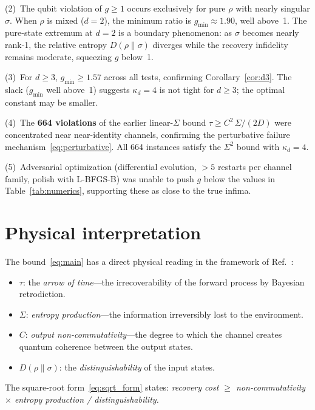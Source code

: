 \documentclass[prl,twocolumn,superscriptaddress,longbibliography,floatfix]{revtex4-2}
\newcommand{\tauasym}{\tau}
\newcommand{\kd}{\kappa_d}
\begin{document}
(2)~The qubit violation of $g \geq 1$ occurs
exclusively for pure $\rho$ with nearly singular
$\sigma$.
When $\rho$ is mixed ($d = 2$), the minimum ratio is
$g_{\min} \approx 1.90$, well above~1.
The pure-state extremum at $d = 2$ is a boundary
phenomenon: as $\sigma$ becomes nearly rank-1,
the relative entropy $D(\rho\|\sigma)$ diverges
while the recovery infidelity remains moderate,
squeezing $g$ below~1.

(3)~For $d \geq 3$, $g_{\min} \geq 1.57$ across all
tests, confirming Corollary~\ref{cor:d3}.
The slack ($g_{\min}$ well above~1) suggests $\kd = 4$
is not tight for $d \geq 3$; the optimal constant may
be smaller.

(4)~The \textbf{664 violations} of the earlier
linear-$\Sigma$ bound $\tauasym \geq C^2\,\Sigma/(2D)$
were concentrated near near-identity channels,
confirming the perturbative failure
mechanism~\eqref{eq:perturbative}.
All 664 instances satisfy the $\Sigma^2$ bound with
$\kd = 4$.

(5)~Adversarial optimization (differential evolution,
$>5$ restarts per channel family, polish with L-BFGS-B)
was unable to push $g$ below the values in
Table~\ref{tab:numerics}, supporting these as close
to the true infima.

\section{Physical interpretation}
\label{sec:physical}

The bound~\eqref{eq:main} has a direct physical reading
in the framework of Ref.~\cite{Huang2026}:
\begin{itemize}
\item $\tauasym$: the \emph{arrow of time}---the
  irrecoverability of the forward process by Bayesian
  retrodiction.
\item $\Sigma$: \emph{entropy production}---the
  information irreversibly lost to the environment.
\item $C$: \emph{output non-commutativity}---the degree
  to which the channel creates quantum coherence between
  the output states.
\item $D(\rho\|\sigma)$: the \emph{distinguishability}
  of the input states.
\end{itemize}
The square-root form~\eqref{eq:sqrt_form} states:
\emph{recovery cost $\geq$ non-commutativity $\times$
entropy production / distinguishability.}
\end{document}
